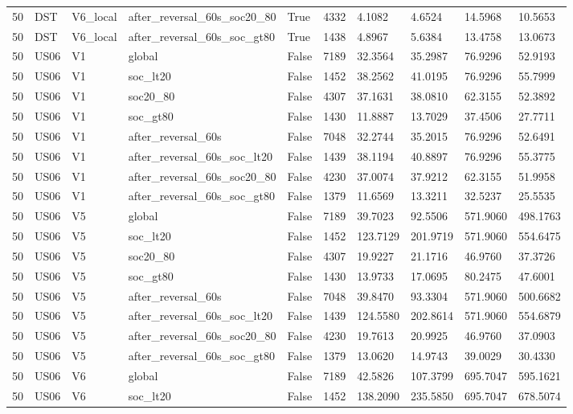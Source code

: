 \begin{tabular}{llllllllll}
50 & DST & V6\_local & after\_reversal\_60s\_soc20\_80 & True & 4332 & 4.1082 & 4.6524 & 14.5968 & 10.5653 \\
50 & DST & V6\_local & after\_reversal\_60s\_soc\_gt80 & True & 1438 & 4.8967 & 5.6384 & 13.4758 & 13.0673 \\
50 & US06 & V1 & global & False & 7189 & 32.3564 & 35.2987 & 76.9296 & 52.9193 \\
50 & US06 & V1 & soc\_lt20 & False & 1452 & 38.2562 & 41.0195 & 76.9296 & 55.7999 \\
50 & US06 & V1 & soc20\_80 & False & 4307 & 37.1631 & 38.0810 & 62.3155 & 52.3892 \\
50 & US06 & V1 & soc\_gt80 & False & 1430 & 11.8887 & 13.7029 & 37.4506 & 27.7711 \\
50 & US06 & V1 & after\_reversal\_60s & False & 7048 & 32.2744 & 35.2015 & 76.9296 & 52.6491 \\
50 & US06 & V1 & after\_reversal\_60s\_soc\_lt20 & False & 1439 & 38.1194 & 40.8897 & 76.9296 & 55.3775 \\
50 & US06 & V1 & after\_reversal\_60s\_soc20\_80 & False & 4230 & 37.0074 & 37.9212 & 62.3155 & 51.9958 \\
50 & US06 & V1 & after\_reversal\_60s\_soc\_gt80 & False & 1379 & 11.6569 & 13.3211 & 32.5237 & 25.5535 \\
50 & US06 & V5 & global & False & 7189 & 39.7023 & 92.5506 & 571.9060 & 498.1763 \\
50 & US06 & V5 & soc\_lt20 & False & 1452 & 123.7129 & 201.9719 & 571.9060 & 554.6475 \\
50 & US06 & V5 & soc20\_80 & False & 4307 & 19.9227 & 21.1716 & 46.9760 & 37.3726 \\
50 & US06 & V5 & soc\_gt80 & False & 1430 & 13.9733 & 17.0695 & 80.2475 & 47.6001 \\
50 & US06 & V5 & after\_reversal\_60s & False & 7048 & 39.8470 & 93.3304 & 571.9060 & 500.6682 \\
50 & US06 & V5 & after\_reversal\_60s\_soc\_lt20 & False & 1439 & 124.5580 & 202.8614 & 571.9060 & 554.6879 \\
50 & US06 & V5 & after\_reversal\_60s\_soc20\_80 & False & 4230 & 19.7613 & 20.9925 & 46.9760 & 37.0903 \\
50 & US06 & V5 & after\_reversal\_60s\_soc\_gt80 & False & 1379 & 13.0620 & 14.9743 & 39.0029 & 30.4330 \\
50 & US06 & V6 & global & False & 7189 & 42.5826 & 107.3799 & 695.7047 & 595.1621 \\
50 & US06 & V6 & soc\_lt20 & False & 1452 & 138.2090 & 235.5850 & 695.7047 & 678.5074 \\

\end{tabular}
